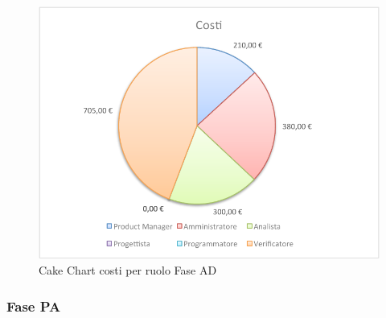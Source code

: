 				\begin{figure}[H]\centering
					\includegraphics[width=\textwidth]{PianoDiProgetto/Pics/ChartTotCostiFaseAD.pdf}
					\caption{Cake Chart costi per ruolo Fase AD}
				\end{figure}
		\subsubsection{Fase PA}

